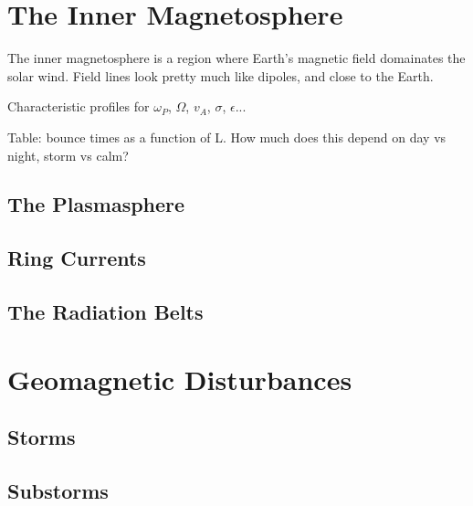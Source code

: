 \section{The Inner Magnetosphere}

The inner magnetosphere is a region where Earth's magnetic field domainates the solar wind. Field lines look pretty much like dipoles, and close to the Earth. 

Characteristic profiles for $\omega_P$, $\Omega$, $v_A$, $\sigma$, $\epsilon$...

Table: bounce times as a function of L. How much does this depend on day vs night, storm vs calm? 

\subsection{The Plasmasphere}

\subsection{Ring Currents}

\subsection{The Radiation Belts}

\section{Geomagnetic Disturbances}

\subsection{Storms}

\subsection{Substorms}






